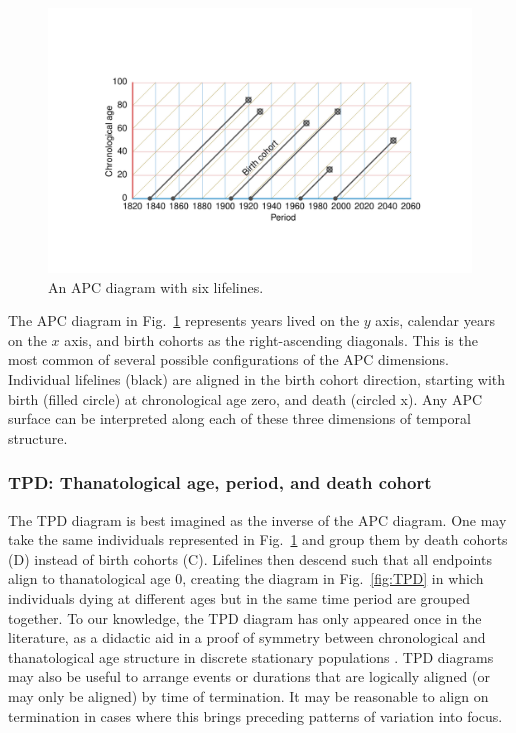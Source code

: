 \documentclass[12pt,oneside,a4paper]{article} %
\theoremstyle{definition}
\begin{document}
\begin{figure}[h!] 
\caption{An APC diagram with six lifelines.}
\label{fig:APC}
\centering
\vspace{-5em}
\includegraphics[scale=0.8]{Figures/APCrt.pdf}
\end{figure}

The APC diagram in Fig.~\ref{fig:APC} represents years lived on the $y$
axis, calendar years on the $x$ axis, and birth cohorts as the right-ascending
diagonals. This is the most common of several possible configurations
of the APC dimensions. Individual lifelines (black) are aligned in the birth
cohort direction, starting with birth (filled circle) at chronological age zero, and death
(circled x). Any APC surface can be interpreted along each of these
three dimensions of temporal structure. 

\FloatBarrier
\subsubsection{TPD: Thanatological age, period, and death cohort}
\label{sec:tpd}
The TPD diagram is best imagined as the inverse of the APC diagram. One may take
the same individuals represented in Fig.~\ref{fig:APC} and group them by death cohorts (D) instead
of birth cohorts (C). Lifelines then descend such that all
endpoints align to thanatological age 0, creating the diagram in
Fig.~\ref{fig:TPD} in which individuals dying at different ages but in the same time period are grouped together.
To our knowledge, the TPD diagram has only appeared once in the literature, as
a didactic aid in a proof of symmetry between chronological and thanatological
age structure in discrete stationary populations \citep{villavicencioRiffeSymmetires2016}. TPD
diagrams may also be useful to arrange events or durations that are logically
aligned (or may only be aligned) by time of termination. It may be reasonable to
align on termination in cases where this brings preceding patterns of
variation into focus.
\end{document}
